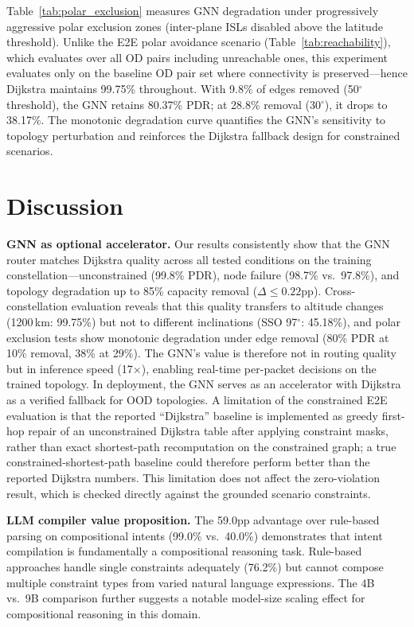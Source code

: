 \documentclass[10pt, conference, letterpaper]{IEEEtran}
\begin{document}
Table~\ref{tab:polar_exclusion} measures GNN degradation under
progressively aggressive polar exclusion zones (inter-plane ISLs
disabled above the latitude threshold). Unlike the E2E polar avoidance
scenario (Table~\ref{tab:reachability}), which evaluates over all OD
pairs including unreachable ones, this experiment evaluates only on
the baseline OD pair set where connectivity is preserved---hence
Dijkstra maintains 99.75\% throughout. With 9.8\% of edges removed
(50$^\circ$ threshold), the GNN retains 80.37\% PDR; at 28.8\%
removal (30$^\circ$), it drops to 38.17\%. The monotonic degradation curve quantifies the
GNN's sensitivity to topology perturbation and reinforces the
Dijkstra fallback design for constrained scenarios.

\section{Discussion}
\label{sec:discussion}

\textbf{GNN as optional accelerator.}
Our results consistently show that the GNN router matches Dijkstra
quality across all tested conditions on the training constellation---unconstrained (99.8\% PDR),
node failure (98.7\% vs.\ 97.8\%), and topology degradation up to
85\% capacity removal ($\Delta \leq 0.22$pp). Cross-constellation
evaluation reveals that this quality transfers to altitude changes
(1200\,km: 99.75\%) but not to different inclinations (SSO 97$^\circ$:
45.18\%), and polar exclusion tests show monotonic degradation under
edge removal (80\% PDR at 10\% removal, 38\% at 29\%). The GNN's
value is therefore not in routing quality but in inference speed
(17$\times$), enabling real-time per-packet decisions on the trained
topology. In deployment, the GNN serves as an accelerator with
Dijkstra as a verified fallback for OOD topologies.
A limitation of the constrained E2E evaluation is that the reported
``Dijkstra'' baseline is implemented as greedy first-hop repair of an
unconstrained Dijkstra table after applying constraint masks, rather than
exact shortest-path recomputation on the constrained graph; a true
constrained-shortest-path baseline could therefore perform better than
the reported Dijkstra numbers. This limitation does not affect the
zero-violation result, which is checked directly against the grounded
scenario constraints.

\textbf{LLM compiler value proposition.}
The 59.0pp advantage over rule-based parsing on compositional intents
(99.0\% vs.\ 40.0\%) demonstrates that intent compilation is
fundamentally a compositional reasoning task. Rule-based approaches
handle single constraints adequately (76.2\%) but cannot compose
multiple constraint types from varied natural language expressions.
The 4B vs.\ 9B comparison further suggests a notable model-size scaling effect
for compositional reasoning in this domain.
\end{document}
